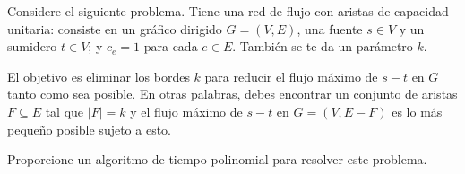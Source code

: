 \documentclass{article}
\begin{document}
Considere el siguiente problema. Tiene una red de flujo con aristas de capacidad
unitaria: consiste en un gráfico dirigido $G = (V , E)$, una fuente $s \in V$ y
un sumidero $t \in V$; y $c_e = 1$ para cada $e \in E$. También se te da un
parámetro $k$.

El objetivo es eliminar los bordes $k$ para reducir el flujo máximo de $s-t$ en
$G$ tanto como sea posible. En otras palabras, debes encontrar un conjunto de
aristas $F \subseteq E$ tal que $|F| = k$ y el flujo máximo de $s-t$ en $G = (V
, E - F)$ es lo más pequeño posible sujeto a esto.

Proporcione un algoritmo de tiempo polinomial para resolver este problema.


% 
% 
\end{document}
